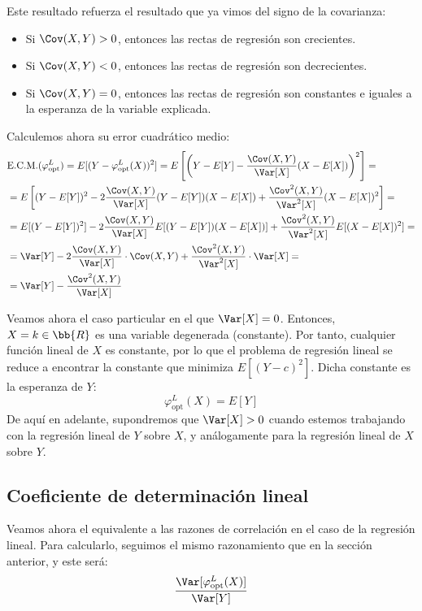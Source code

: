 Este resultado refuerza el resultado que ya vimos del signo de la covarianza:
\begin{itemize}
    \item Si $\Cov(X,Y)>0$, entonces las rectas de regresión son crecientes.
    \item Si $\Cov(X,Y)<0$, entonces las rectas de regresión son decrecientes.
    \item Si $\Cov(X,Y)=0$, entonces las rectas de regresión son constantes e iguales a la esperanza de la variable explicada.
\end{itemize}

Calculemos ahora su error cuadrático medio:
\begin{align*}
    &\text{E.C.M.}(\varphi_{\text{opt}}^L)
    = E[(Y - \varphi_{\text{opt}}^L(X))^2]
    = E\left[\left(Y - E[Y] - \dfrac{\Cov(X,Y)}{\Var[X]}(X - E[X])\right)^2\right]
    =\\&=
    E\left[
        (Y-E[Y])^2 - 2\dfrac{\Cov(X,Y)}{\Var[X]}(Y-E[Y])(X-E[X]) + \dfrac{\Cov^2(X,Y)}{\Var^2[X]}(X-E[X])^2
    \right]=\\
    &= E[(Y-E[Y])^2] - 2\dfrac{\Cov(X,Y)}{\Var[X]}E[(Y-E[Y])(X-E[X])] + \dfrac{\Cov^2(X,Y)}{\Var^2[X]}E[(X-E[X])^2]
    =\\
    &= \Var[Y] - 2\dfrac{\Cov(X,Y)}{\Var[X]}\cdot \Cov(X,Y) + \dfrac{\Cov^2(X,Y)}{\Var^2[X]}\cdot \Var[X] =\\
    &= \Var[Y] - \dfrac{\Cov^2(X,Y)}{\Var[X]}
\end{align*}

Veamos ahora el caso particular en el que $\Var[X]=0$. Entonces, $X=k\in \bb{R}$ es una variable degenerada (constante). Por tanto, cualquier función lineal de $X$ es constante, por lo que el problema de regresión lineal se reduce a encontrar la constante que minimiza $E[(Y - c)^2]$. Dicha constante es la esperanza de $Y$:
\begin{equation*}
    \varphi_{\text{opt}}^L(X) = E[Y]
\end{equation*}
De aquí en adelante, supondremos que $\Var[X]>0$ cuando estemos trabajando con la regresión lineal de $Y$ sobre $X$, y análogamente para la regresión lineal de $X$ sobre $Y$. 

\subsection{Coeficiente de determinación lineal}

Veamos ahora el equivalente a las razones de correlación en el caso de la regresión lineal. Para calcularlo, seguimos el mismo razonamiento que en la sección anterior, y este será:
\begin{equation*}
    \dfrac{\Var[\varphi_{\text{opt}}^L(X)]}{\Var[Y]}
\end{equation*}

